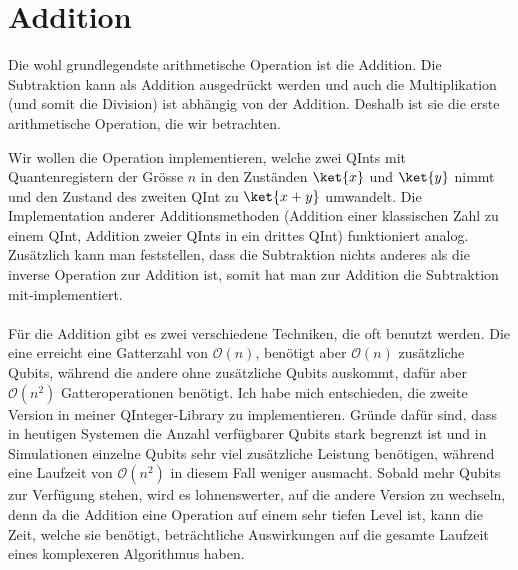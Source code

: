 \section{Addition}
Die wohl grundlegendste arithmetische Operation ist die Addition. Die Subtraktion kann als Addition ausgedrückt werden und auch die Multiplikation (und somit die Division) ist abhängig von der Addition. Deshalb ist sie die erste arithmetische Operation, die wir betrachten. 

Wir wollen die Operation implementieren, welche zwei QInts mit Quantenregistern der Grösse $n$ in den Zuständen $\ket{x}$ und $\ket{y}$ nimmt und den Zustand des zweiten QInt zu $\ket{x + y}$ umwandelt. Die Implementation anderer Additionsmethoden (Addition einer klassischen Zahl zu einem QInt, Addition zweier QInts in ein drittes QInt) funktioniert analog. Zusätzlich kann man feststellen, dass die Subtraktion nichts anderes als die inverse Operation zur Addition ist, somit hat man zur Addition die Subtraktion mit-implementiert.

\paragraph{}

Für die Addition gibt es zwei verschiedene Techniken, die oft benutzt werden. Die eine erreicht eine Gatterzahl von $\mathcal O(n)$, benötigt aber $\mathcal O(n)$ zusätzliche Qubits, während die andere ohne zusätzliche Qubits auskommt, dafür aber $\mathcal O(n^2)$ Gatteroperationen benötigt. Ich habe mich entschieden, die zweite Version in meiner QInteger-Library zu implementieren. Gründe dafür sind, dass in heutigen Systemen die Anzahl verfügbarer Qubits stark begrenzt ist und in Simulationen einzelne Qubits sehr viel zusätzliche Leistung benötigen, während eine Laufzeit von $\mathcal O(n^2)$ in diesem Fall weniger ausmacht. Sobald mehr Qubits zur Verfügung stehen, wird es lohnenswerter, auf die andere Version zu wechseln, denn da die Addition eine Operation auf einem sehr tiefen Level ist, kann die Zeit, welche sie benötigt, beträchtliche Auswirkungen auf die gesamte Laufzeit eines komplexeren Algorithmus haben.

\paragraph{}

